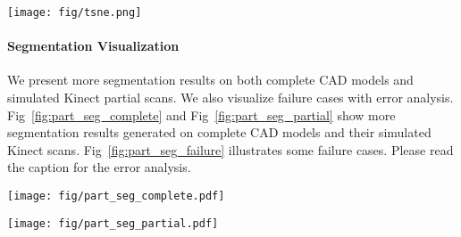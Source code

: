 \documentclass[10pt,twocolumn,letterpaper]{article}
\begin{document}
\begin{figure*}[t!]
\centering
\texttt{[image: fig/tsne.png]}
\caption{\textbf{2D embedding of learnt shape global features.} We use t-SNE technique to visualize the learnt global shape features for the shapes in ModelNet40 test split.}
\label{fig:tsne}
\end{figure*}


\paragraph{Segmentation Visualization} We present more segmentation results on both complete CAD models and simulated Kinect partial scans. We also visualize failure cases with error analysis. Fig~\ref{fig:part_seg_complete} and Fig~\ref{fig:part_seg_partial} show more segmentation results generated on complete CAD models and their simulated Kinect scans. Fig~\ref{fig:part_seg_failure} illustrates some failure cases. Please read the caption for the error analysis.

\begin{figure*}[t!]
\centering
\texttt{[image: fig/part\_seg\_complete.pdf]}
\caption{\textbf{PointNet segmentation results on complete CAD models.} }
\label{fig:part_seg_complete}
\end{figure*}

\begin{figure*}[t!]
\centering
\texttt{[image: fig/part\_seg\_partial.pdf]}
\caption{\textbf{PointNet segmentation results on simulated Kinect scans.} }
\label{fig:part_seg_partial}
\end{figure*}
\end{document}
